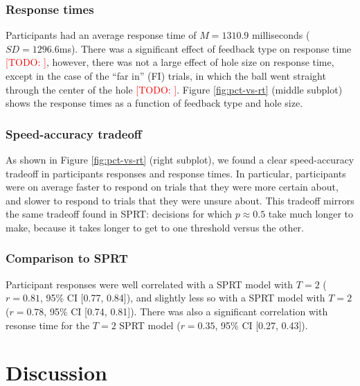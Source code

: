 \documentclass[11pt]{article}
\newcommand{\TODO}[1]{\textcolor{red}{[TODO: #1]}}
\begin{document}
\subsubsection{Response times}

Participants had an average response time of $M=1310.9$ milliseconds ($SD=1296.6$ms). There was a significant effect of feedback type on response time \TODO{}, however, there was not a large effect of hole size on response time, except in the case of the ``far in'' (FI) trials, in which the ball went straight through the center of the hole \TODO{}. Figure \ref{fig:pct-vs-rt} (middle subplot) shows the response times as a function of feedback type and hole size.

\subsubsection{Speed-accuracy tradeoff}

As shown in Figure \ref{fig:pct-vs-rt} (right subplot), we found a clear speed-accuracy tradeoff in participants responses and response times. In particular, participants were on average faster to respond on trials that they were more certain about, and slower to respond to trials that they were unsure about. This tradeoff mirrors the same tradeoff found in SPRT: decisions for which $p\approx0.5$ take much longer to make, because it takes longer to get to one threshold versus the other.

\subsubsection{Comparison to SPRT}

Participant responses were well correlated with a SPRT model with $T=2$ ($r=0.81$, 95\% CI [0.77, 0.84]), and slightly less so with a SPRT model with $T=2$ ($r=0.78$, 95\% CI [0.74, 0.81]). There was also a significant correlation with resonse time for the $T=2$ SPRT model ($r=0.35$, 95\% CI [0.27, 0.43]).

\section{Discussion}


\end{document}
